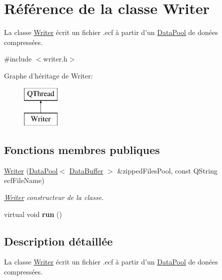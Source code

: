 \hypertarget{class_writer}{\section{Référence de la classe Writer}
\label{class_writer}
}


La classe \hyperlink{class_writer}{Writer} écrit un fichier .ecf à partir d'un \hyperlink{class_data_pool}{Data\+Pool} de donées compressées.  




{\ttfamily \#include $<$writer.\+h$>$}

Graphe d'héritage de Writer\+:\begin{figure}[H]
\begin{center}
\leavevmode
\includegraphics[height=2.000000cm]{class_writer}
\end{center}
\end{figure}
\subsection*{Fonctions membres publiques}
\begin{DoxyCompactItemize}
\item 
\hyperlink{class_writer_a02f7fe50cb56bb1bc76c7dcd399e8f38}{Writer} (\hyperlink{class_data_pool}{Data\+Pool}$<$ \hyperlink{class_data_buffer}{Data\+Buffer} $>$ \&zipped\+Files\+Pool, const Q\+String ecf\+File\+Name)
\begin{DoxyCompactList}\small\item\em \hyperlink{class_writer}{Writer} constructeur de la classe. \end{DoxyCompactList}\item 
\hypertarget{class_writer_a831f640296e4534fe5f31097fcb0712b}{virtual void {\bfseries run} ()}\label{class_writer_a831f640296e4534fe5f31097fcb0712b}

\end{DoxyCompactItemize}


\subsection{Description détaillée}
La classe \hyperlink{class_writer}{Writer} écrit un fichier .ecf à partir d'un \hyperlink{class_data_pool}{Data\+Pool} de donées compressées. 

